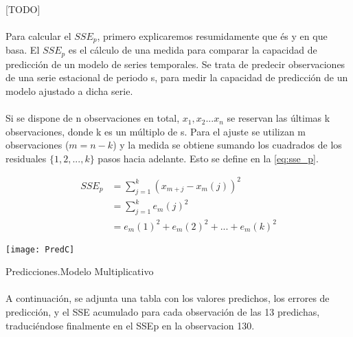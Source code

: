 \documentclass[a4paper, spanish]{article}
\begin{document}
    \paragraph{}
    [TODO]

    \paragraph{}
    Para calcular el $SSE_p$, primero explicaremos resumidamente que és y en que basa. El $SSE_p$ es el cálculo de una medida para comparar la capacidad de predicción de un modelo de series temporales.
    Se trata de predecir observaciones de una serie estacional de periodo s, para
    medir la capacidad de predicción de un modelo ajustado a dicha serie.

    \paragraph{}
    Si se dispone de n observaciones en total, $x_1,x_2...x_n$ se reservan las últimas k observaciones, donde k es un múltiplo de s. Para el ajuste se utilizan m observaciones ($m = n - k$) y la medida se obtiene sumando los cuadrados de los residuales $\{1, 2, ..., k\}$ pasos hacia adelante. Esto se define en la \autoref{eq:sse_p}.

    \begin{equation}
    \label{eq:sse_p}
      \begin{split}
        SSE_p
        &= \sum_{j = 1} ^ k (x_{m + j} - x_{m}(j)) ^ 2 \\
        &= \sum_{j = 1} ^ k e_m(j) ^ 2 \\
        &= e_m(1) ^ 2 + e_m(2) ^ 2 + ... + e_m(k) ^ 2
      \end{split}
    \end{equation}

    \begin{table}[htb!]
      \centering
      \texttt{[image: PredC]}
      \caption{Predicciones.Modelo Multiplicativo}
      \label{}
    \end{table}

    \paragraph{}
    A continuación, se adjunta una tabla con los valores predichos, los errores de predicción, y el SSE acumulado para cada observación de las 13 predichas, traduciéndose finalmente en el SSEp en la observacion 130.
\end{document}
